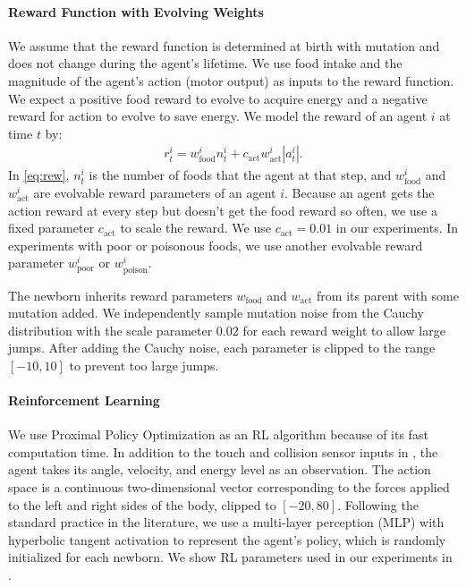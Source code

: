 \paragraph{Reward Function with Evolving Weights}
We assume that the reward function is determined at birth with mutation and does not change during the agent's lifetime. We use food intake and the magnitude of the agent's action (motor output) as inputs to the reward function. We expect a positive food reward to evolve to acquire energy and a negative reward for action to evolve to save energy.
We model the reward of an agent $i$ at time $t$ by:
\begin{align}
  r^{i}_{t} = w_{\mathrm{food}}^{i}n_{t}^{i} + c_\mathrm{act} w_{\mathrm{act}}^{i}|a_{t}^{i}|\label{eq:rew}.
\end{align}
In \cref{eq:rew}, $n_{t}^{i}$ is the number of foods that the agent at that step, and $w_{\mathrm{food}}^{i}$ and $w_{\mathrm{act}}^{i}$ are evolvable reward parameters of an agent $i$. Because an agent gets the action reward at every step but doesn't get the food reward so often, we use a fixed parameter $c_\mathrm{act}$ to scale the reward. We use $c_\mathrm{act}=0.01$ in our experiments. In experiments with poor or poisonous foods, we use another evolvable reward parameter $w_{\mathrm{poor}}^{i}$ or $w_{\mathrm{poison}}^{i}$.

The newborn inherits reward parameters $w_{\mathrm{food}}$ and $w_{\mathrm{act}}$ from its parent with some mutation added. We independently sample mutation noise from the Cauchy distribution with the scale parameter $0.02$ for each reward weight to allow large jumps. After adding the Cauchy noise, each parameter is clipped to the range $[-10, 10]$ to prevent too large jumps.

\paragraph{Reinforcement Learning}
We use Proximal Policy Optimization \citep{schulmanProximalPolicyOptimization2017} as an RL algorithm because of its fast computation time. In addition to the touch and collision sensor inputs in , the agent takes its angle, velocity, and energy level as an observation. The action space is a continuous two-dimensional vector corresponding to the forces applied to the left and right sides of the body, clipped to $[-20, 80]$. Following the standard practice in the literature, we use a multi-layer perception (MLP) with hyperbolic tangent activation to represent the agent's policy, which is randomly initialized for each newborn. We show RL parameters used in our experiments in .

